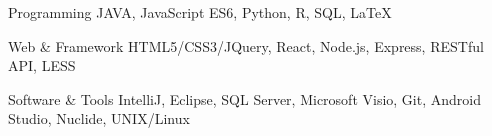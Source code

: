 

\begin{cvskills}

  \cvskill
    {Programming} %
    {JAVA, JavaScript ES6, Python, R, SQL, LaTeX} %

  \cvskill
    {Web \& Framework} %
    {HTML5/CSS3/JQuery, React, Node.js, Express, RESTful API, LESS} %

  \cvskill
    {Software \& Tools} %
    {IntelliJ, Eclipse, SQL Server, Microsoft Visio, Git, Android Studio, Nuclide, UNIX/Linux} %

\end{cvskills}
